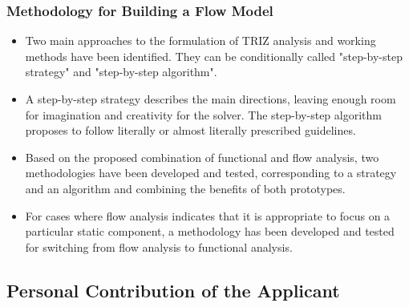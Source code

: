 \documentclass[a4paper,11pt]{article}
\begin{document}
\subsubsection{Methodology for Building a Flow Model}
\begin{itemize}
\item Two main approaches to the formulation of TRIZ analysis and working
  methods have been identified. They can be conditionally called "step-by-step
  strategy" and "step-by-step algorithm".
\item A step-by-step strategy describes the main directions, leaving enough
  room for imagination and creativity for the solver. The step-by-step
  algorithm proposes to follow literally or almost literally prescribed
  guidelines.
\item Based on the proposed combination of functional and flow analysis, two
  methodologies have been developed and tested, corresponding to a strategy
  and an algorithm and combining the benefits of both prototypes.
\item For cases where flow analysis indicates that it is appropriate to focus
  on a particular static component, a methodology has been developed and
  tested for switching from flow analysis to functional analysis.
\end{itemize}

\subsection{Personal Contribution of the Applicant}
\end{document}
